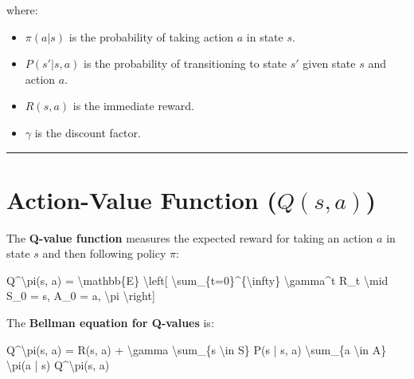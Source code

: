 \documentclass[
]{book}
\newenvironment{Shaded}{\begin{snugshade}}{\end{snugshade}}
\newcommand{\NormalTok}[1]{#1}
\providecommand{\tightlist}{%
  \setlength{\itemsep}{0pt}\setlength{\parskip}{0pt}}
\begin{document}
where:

\begin{itemize}
\tightlist
\item
  \(\pi(a | s)\) is the probability of taking action \(a\) in state \(s\).
\item
  \(P(s' | s, a)\) is the probability of transitioning to state \(s'\) given state \(s\) and action \(a\).
\item
  \(R(s, a)\) is the immediate reward.
\item
  \(\gamma\) is the discount factor.
\end{itemize}

\begin{center}\rule{0.5\linewidth}{0.5pt}\end{center}

\section{\texorpdfstring{\textbf{Action-Value Function (\(Q(s, a)\))}}{Action-Value Function (Q(s, a))}}\label{action-value-function-qs-a}

The \textbf{Q-value function} measures the expected reward for taking an action \(a\) in state \(s\) and then following policy \(\pi\):

\begin{Shaded}
\begin{Highlighting}[]
\NormalTok{Q\^{}\textbackslash{}pi(s, a) = \textbackslash{}mathbb\{E\} \textbackslash{}left[ \textbackslash{}sum\_\{t=0\}\^{}\{\textbackslash{}infty\} \textbackslash{}gamma\^{}t R\_t \textbackslash{}mid S\_0 = s, A\_0 = a, \textbackslash{}pi \textbackslash{}right]}
\end{Highlighting}
\end{Shaded}

The \textbf{Bellman equation for Q-values} is:

\begin{Shaded}
\begin{Highlighting}[]
\NormalTok{Q\^{}\textbackslash{}pi(s, a) = R(s, a) + \textbackslash{}gamma \textbackslash{}sum\_\{s\textquotesingle{} \textbackslash{}in S\} P(s\textquotesingle{} | s, a) \textbackslash{}sum\_\{a\textquotesingle{} \textbackslash{}in A\} \textbackslash{}pi(a\textquotesingle{} | s\textquotesingle{}) Q\^{}\textbackslash{}pi(s\textquotesingle{}, a\textquotesingle{})}
\end{Highlighting}
\end{Shaded}
\end{document}
